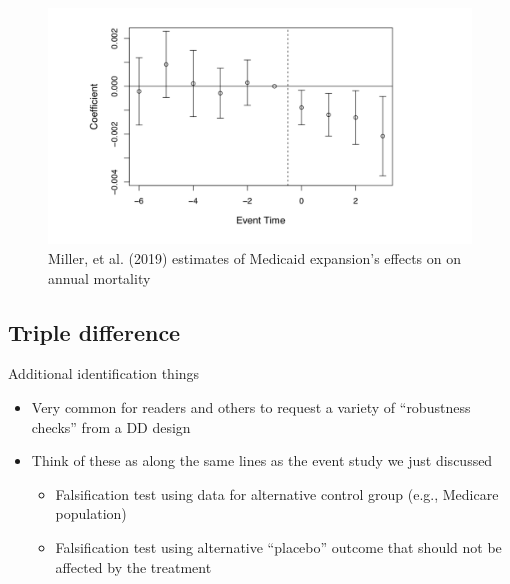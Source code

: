 \documentclass{beamer}
\begin{document}





\begin{frame}[plain]

	\begin{figure}
	\includegraphics[scale=0.3]{./lecture_includes/Miller_Medicaid4.png}
	\caption{Miller, et al. (2019) estimates of Medicaid expansion's effects on on annual mortality}
	\end{figure}

\end{frame}

\subsection{Triple difference}

\begin{frame}{Additional identification things}
	
	\begin{itemize}
	\item Very common for readers and others to request a variety of ``robustness checks'' from a DD design
	\item Think of these as along the same lines as the event study we just discussed
		\begin{itemize}
		\item Falsification test using data for alternative control group (e.g., Medicare population)
		\item Falsification test using alternative ``placebo'' outcome that should not be affected by the treatment
		\end{itemize}
	\end{itemize}
\end{frame}
\end{document}

